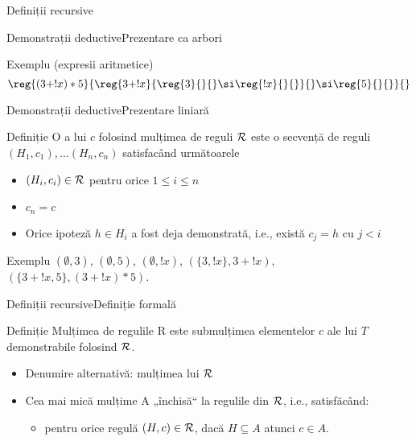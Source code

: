 \begin{section}{Definiții recursive}
\begin{frame}{Demonstrații deductive}{Prezentare ca arbori}
 \begin{block}{Exemplu (expresii aritmetice)}
     \[\reg{(3 + ! x) * 5 }{
            {\displaystyle\reg{3 + ! x}{\displaystyle\reg{3}{}{}\si \reg{ ! x}{}{}}{}\si \reg{5}{}{}}{}}{}\]
  \end{block}
\end{frame}

\begin{frame}{Demonstrații deductive}{Prezentare liniară}
   \begin{block}{Definiție}
       O  a lui $c$ folosind mulțimea de reguli $\cal R$  este o secvență
de reguli $(H_1, c_1), \ldots (H_n, c_n)$ satisfacând următoarele    
     \begin{itemize}
          \item $(H_i, c_i) \in \cal R$ pentru orice $1\leq i \leq n$
          \item $c_n = c$
          \item Orice ipoteză $h \in H_i$ a fost deja demonstrată, i.e., există $c_j = h$ cu $j<i$ 
     \end{itemize}
    \end{block}

  \begin{block}{Exemplu}
      $(\emptyset, 3)$,
      $(\emptyset, 5)$,
      $(\emptyset, ! x)$,
      $(\{3, !x \}, 3 + ! x)$,
     $(\{3 + ! x, 5\}, (3 + ! x) * 5)$.
  \end{block}
\end{frame}

\begin{frame}{Definiții recursive}{Definiție formală}
  \begin{block}{Definiție}
     Mulțimea  de regulile {\cal R} este submulțimea elementelor $c$ ale lui $T$ demonstrabile folosind $\cal R$.
  \end{block}

\begin{itemize}
  \item Denumire alternativă: mulțimea  lui ${\cal R}$
  \item Cea mai mică mulțime A „închisă“ la regulile din $\cal R$, i.e.,  satisfăcând:
  \begin{itemize}
      \item pentru orice regulă $(H,c) \in {\cal R}$, dacă $H\subseteq A$ atunci $c\in A$.
  \end{itemize}
\end{itemize}

\end{frame}


\end{section}

